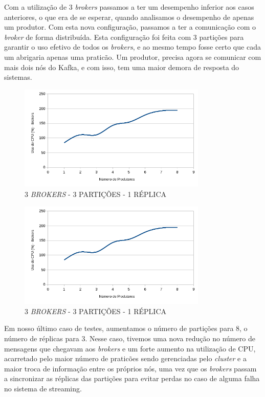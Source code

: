 \documentclass[12pt]{article}
\begin{document}
Com a utilização de 3 \textit{brokers} passamos a ter um desempenho inferior aos casos anteriores, o que era de se esperar, quando analisamos o desempenho de apenas um produtor. Com esta nova configuração, passamos a ter a comunicação com o \textit{broker} de forma distribuída. Esta configuração foi feita com 3 partições para garantir o uso efetivo de todos os \textit{brokers}, e ao mesmo tempo fosse certo que cada um abrigaria apenas uma praticão. Um produtor, precisa agora se comunicar com mais dois nós do Kafka, e com isso, tem uma maior demora de resposta do sistemas.

\begin{figure}[ht]
    \centering
    \includegraphics[width=0.8\textwidth]{images/graficos/g3b.png}
    \caption{3 \textit{BROKERS} - 3 PARTIÇÕES - 1 RÉPLICA}
    \label{fig:g3a}
\end{figure}

\begin{figure}[ht]
    \centering
    \includegraphics[width=0.8\textwidth]{images/graficos/g3b.png}
    \caption{3 \textit{BROKERS} - 3 PARTIÇÕES - 1 RÉPLICA}
    \label{fig:g3b}
\end{figure}
\clearpage

Em nosso último caso de testes, aumentamos o número de partições para 8, o número de réplicas para 3. Nesse caso, tivemos uma nova redução no número de mensagens que chegavam aos \textit{brokers} e um forte aumento na utilização de CPU, acarretado pelo maior número de  praticões sendo gerenciadas pelo \textit{cluster} e a maior troca de informação entre os próprios nós, uma vez que os \textit{brokers} passam a sincronizar as réplicas das partições para evitar perdas no caso de alguma falha no sistema de streaming.
\end{document}
